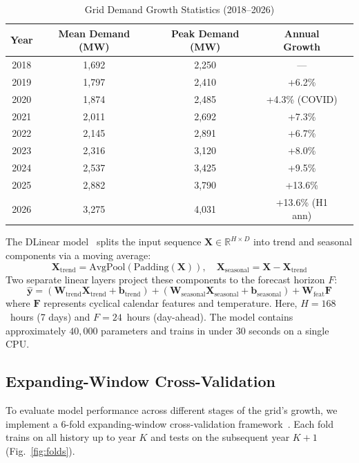 \documentclass[10pt,twocolumn,letterpaper]{article}
\begin{document}
\begin{table}[h]
\centering
\small
\setlength{\tabcolsep}{3pt}
\caption{Grid Demand Growth Statistics (2018--2026)}
\label{tab:growth_stats}
\begin{tabular}{@{}ccccc@{}}
\toprule
\textbf{Year} & \textbf{Mean Demand (MW)} & \textbf{Peak Demand (MW)} & \textbf{Annual Growth} \\ \midrule
2018 & 1,692 & 2,250 & --- \\
2019 & 1,797 & 2,410 & +6.2\% \\
2020 & 1,874 & 2,485 & +4.3\% (COVID) \\
2021 & 2,011 & 2,692 & +7.3\% \\
2022 & 2,145 & 2,891 & +6.7\% \\
2023 & 2,316 & 3,120 & +8.0\% \\
2024 & 2,537 & 3,425 & +9.5\% \\
2025 & 2,882 & 3,790 & +13.6\% \\
2026 & 3,275 & 4,031 & +13.6\% (H1 ann) \\ \bottomrule
\end{tabular}
\end{table}

The DLinear model~\cite{zeng2023transformers} splits the input sequence $\mathbf{X} \in \mathbb{R}^{H \times D}$ into trend and seasonal components via a moving average:
\begin{equation}
\mathbf{X}_{\text{trend}} = \text{AvgPool}(\text{Padding}(\mathbf{X})), \quad \mathbf{X}_{\text{seasonal}} = \mathbf{X} - \mathbf{X}_{\text{trend}}
\end{equation}
Two separate linear layers project these components to the forecast horizon $F$:
\begin{equation}
\hat{\mathbf{y}} = (\mathbf{W}_{\text{trend}} \mathbf{X}_{\text{trend}} + \mathbf{b}_{\text{trend}}) + (\mathbf{W}_{\text{seasonal}} \mathbf{X}_{\text{seasonal}} + \mathbf{b}_{\text{seasonal}}) + \mathbf{W}_{\text{feat}} \mathbf{F}
\end{equation}
where $\mathbf{F}$ represents cyclical calendar features and temperature. Here, $H = 168$~hours (7 days) and $F = 24$~hours (day-ahead). The model contains approximately $40,000$ parameters and trains in under 30 seconds on a single CPU.

\subsection{Expanding-Window Cross-Validation}
To evaluate model performance across different stages of the grid's growth, we implement a 6-fold expanding-window cross-validation framework~\cite{hyndman2021forecasting}. Each fold trains on all history up to year $K$ and tests on the subsequent year $K+1$ (Fig.~\ref{fig:folds}).
\end{document}
